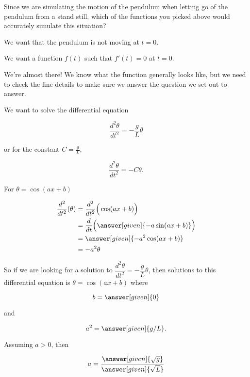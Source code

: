 \documentclass[handout,nooutcomes]{ximera}
\begin{document}
\begin{example}
\begin{explanation}
\begin{question}
Since we are simulating the motion of the pendulum when letting go of the pendulum from
a stand still, which of the functions you picked above would accurately simulate this situation?
\begin{selectAll}
\end{selectAll}
\begin{hint}
We want that the pendulum is not moving at $t=0$.
\end{hint}
\begin{hint}
We want a function $f(t)$ such that $f'(t) = 0$ at $t=0$.
\end{hint}
\end{question}

We're almost there! We know what the function generally looks like, but we
need to check the fine details to make sure we answer the question we set out to answer.

We want to solve the differential equation

\[
\dfrac{d^2 \theta}{d t^2}  = -\dfrac{g}{L} \theta
\]

or for the constant $C=\frac{g}{L}$,

\[
\dfrac{d^2 \theta}{d t^2}  = -C\theta.
\]

For $\theta = \cos(ax+b)$

\begin{align*}
    \dfrac{d^2}{d t^2}(\theta) &= \dfrac{d^2}{d t^2}\Big(\cos(a x + b)\Big)\\
    &= \dfrac{d}{d t} \Big( \answer[given]{- a \sin(a x+b)}\Big)\\
    &= \answer[given]{-a^2 \cos(a x+b)}\\
    &= -a^2 \theta 
\end{align*}

\begin{question}
So if we are looking for a solution to $\dfrac{d^2 \theta}{d t^2}  = -\dfrac{g}{L} \theta$,
then solutions to this differential equation is $\theta = \cos(ax+b)$ where

\[
b = \answer[given]{0}
\]

and 

\[
a^2 = \answer[given]{g/L}.
\]

Assuming $a>0$, then 

\[
a = \dfrac{\answer[given]{\sqrt{g}}}{\answer[given]{\sqrt{L}}}
\]
\end{question}


\end{explanation}
\end{example}
\end{document}
